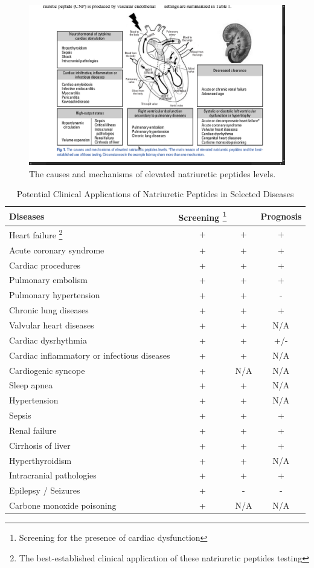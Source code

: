 \documentclass[14pt,a4paper,onecolumn]{article}
\begin{document}
\begin{figure}
    \includegraphics{./images/NP_causes.png}
    \caption{The causes and mechanisms of elevated natriuretic peptides levels.}
    \label{NP_causes}
\end{figure}

\begin{table}
    \begin{tabular}{|l|c|c|c|}
        \hline
        Diseases & Screening \footnote{Screening for the presence of cardiac dysfunction} &  & Prognosis \\
        \hline
        Heart failure \footnote{The best-established clinical application of these natriuretic peptides testing} & + & + & + \\
        Acute coronary syndrome & + & + & + \\
        Cardiac procedures & + & + & + \\
        Pulmonary embolism & + & + & + \\
        Pulmonary hypertension & + & + & - \\
        Chronic lung diseases & + & + & + \\
        Valvular heart diseases & + & + & N/A \\
        Cardiac dysrhythmia & + & + & +/- \\
        Cardiac inflammatory or infectious diseases & + & + & N/A \\
        Cardiogenic syncope & + & N/A & N/A \\
        Sleep apnea & + & + & N/A \\
        Hypertension & + & + & N/A \\
        Sepsis & + & + & + \\
        Renal failure & + & + & + \\
        Cirrhosis of liver & + & + & + \\
        Hyperthyroidism & + & + & N/A \\
        Intracranial pathologies & + & + & + \\
        Epilepsy / Seizures & + & - & - \\
        Carbone monoxide poisoning & + & N/A & N/A \\
        \hline
    \end{tabular}
    \caption{Potential Clinical Applications of Natriuretic Peptides in Selected Diseases}
    \label{NP_applications}
\end{table}
\end{document}
